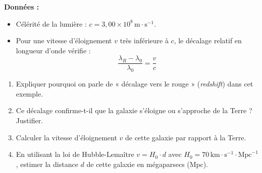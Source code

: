 \documentclass[12pt,a4paper]{article}
\begin{document}
\textbf{Données :}
\begin{itemize}
    \item Célérité de la lumière : $c = 3,00 \times 10^8\,\text{m}\cdot\text{s}^{-1}$.
    \item Pour une vitesse d'éloignement $v$ très inférieure à $c$, le décalage relatif en longueur d'onde vérifie :
    \[ \frac{\lambda_R - \lambda_0}{\lambda_0} = \frac{v}{c} \]
\end{itemize}

\begin{enumerate}
    \item Expliquer pourquoi on parle de « décalage vers le rouge » (\textit{redshift}) dans cet exemple.
    \item Ce décalage confirme-t-il que la galaxie s'éloigne ou s'approche de la Terre ? Justifier.
    \item Calculer la vitesse d'éloignement $v$ de cette galaxie par rapport à la Terre.
    \item En utilisant la loi de Hubble-Lemaître $v = H_0 \cdot d$ avec $H_0 = 70\,\text{km}\cdot\text{s}^{-1}\cdot\text{Mpc}^{-1}$, estimer la distance $d$ de cette galaxie en mégaparsecs ($\text{Mpc}$).
\end{enumerate}
\end{document}
